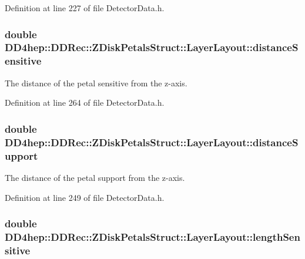 Definition at line 227 of file DetectorData.h.\hypertarget{struct_d_d4hep_1_1_d_d_rec_1_1_z_disk_petals_struct_1_1_layer_layout_a818dac342e6299ca88f0062682f7008d}{
\subsubsection[{distanceSensitive}]{\setlength{\rightskip}{0pt plus 5cm}double {\bf DD4hep::DDRec::ZDiskPetalsStruct::LayerLayout::distanceSensitive}}}
\label{struct_d_d4hep_1_1_d_d_rec_1_1_z_disk_petals_struct_1_1_layer_layout_a818dac342e6299ca88f0062682f7008d}


The distance of the petal sensitive from the z-\/axis. 

Definition at line 264 of file DetectorData.h.\hypertarget{struct_d_d4hep_1_1_d_d_rec_1_1_z_disk_petals_struct_1_1_layer_layout_a2c3400e7a403bd903dfe542baaae4ead}{
\subsubsection[{distanceSupport}]{\setlength{\rightskip}{0pt plus 5cm}double {\bf DD4hep::DDRec::ZDiskPetalsStruct::LayerLayout::distanceSupport}}}
\label{struct_d_d4hep_1_1_d_d_rec_1_1_z_disk_petals_struct_1_1_layer_layout_a2c3400e7a403bd903dfe542baaae4ead}


The distance of the petal support from the z-\/axis. 

Definition at line 249 of file DetectorData.h.\hypertarget{struct_d_d4hep_1_1_d_d_rec_1_1_z_disk_petals_struct_1_1_layer_layout_a4508db5622466189d102ac9289c6c3b9}{
\subsubsection[{lengthSensitive}]{\setlength{\rightskip}{0pt plus 5cm}double {\bf DD4hep::DDRec::ZDiskPetalsStruct::LayerLayout::lengthSensitive}}}
\label{struct_d_d4hep_1_1_d_d_rec_1_1_z_disk_petals_struct_1_1_layer_layout_a4508db5622466189d102ac9289c6c3b9}


